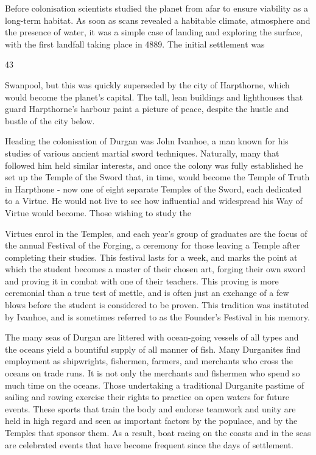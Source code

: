 Before colonisation scientists studied the planet from afar to ensure viability as a long-term habitat. As soon as scans revealed a habitable climate, atmosphere and the presence of water, it was a simple case of landing and exploring the surface, with the first landfall taking place in 4889. The initial settlement was

43

Swanpool, but this was quickly superseded by the city of Harpthorne, which would become the planet's capital. The tall, lean buildings and lighthouses that guard Harpthorne's harbour paint a picture of peace, despite the hustle and bustle of the city below.

Heading the colonisation of Durgan was John Ivanhoe, a man known for his studies of various ancient martial sword techniques. Naturally, many that followed him held similar interests, and once the colony was fully established he set up the Temple of the Sword that, in time, would become the Temple of Truth in Harpthone - now one of eight separate Temples of the Sword, each dedicated to a Virtue. He would not live to see how influential and widespread his Way of Virtue would become. Those wishing to study the

Virtues enrol in the Temples, and each year's group of graduates are the focus of the annual Festival of the Forging, a ceremony for those leaving a Temple after completing their studies. This festival lasts for a week, and marks the point at which the student becomes a master of their chosen art, forging their own sword and proving it in combat with one of their teachers. This proving is more ceremonial than a true test of mettle, and is often just an exchange of a few blows before the student is considered to be proven. This tradition was instituted by Ivanhoe, and is sometimes referred to as the Founder's Festival in his memory.

The many seas of Durgan are littered with ocean-going vessels of all types and the oceans yield a bountiful supply of all manner of fish. Many Durganites find employment as shipwrights, fishermen, farmers, and merchants who cross the oceans on trade runs. It is not only the merchants and fishermen who spend so much time on the oceans. Those undertaking a traditional Durganite pastime of sailing and rowing exercise their rights to practice on open waters for future events. These sports that train the body and endorse teamwork and unity are held in high regard and seen as important factors by the populace, and by the Temples that sponsor them. As a result, boat racing on the coasts and in the seas are celebrated events that have become frequent since the days of settlement.

